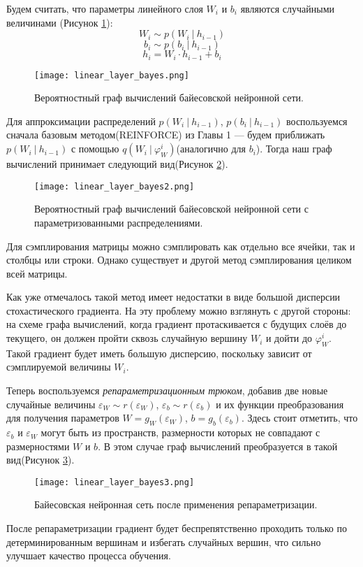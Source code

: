 Будем считать, что параметры линейного слоя $W_i$ и $b_i$ являются случайными величинами (Рисунок \ref{fig:linear_layer_bayes}):
$$W_i \sim p(W_i\ |\ h_{i-1})$$
$$b_i \sim p(b_i\ |\ h_{i-1})$$
$$h_i = W_i \cdot h_{i-1} + b_i$$
\begin{figure}[H]
    \centering
    \texttt{[image: linear\_layer\_bayes.png]}
    \caption{Вероятностный граф вычислений байесовской нейронной сети.}
    \label{fig:linear_layer_bayes}
\end{figure}
Для аппроксимации распределений $p(W_i\ |\ h_{i-1})$, $p(b_i\ |\ h_{i-1})$ воспользуемся сначала базовым методом(REINFORCE) из Главы 1 --- будем приближать $p(W_i\ |\ h_{i-1})$ с помощью $q(W_i\ |\ \varphi_W^i)$(аналогично для $b_i$). Тогда
 наш граф вычислений принимает следующий вид(Рисунок \ref{fig:linear_layer_bayes2}).
\begin{figure}[H]
    \centering
    \texttt{[image: linear\_layer\_bayes2.png]}
    \caption{Вероятностный граф вычислений байесовской нейронной сети с параметризованными распределениями.}
    \label{fig:linear_layer_bayes2}
\end{figure}
Для сэмплирования матрицы можно сэмплировать как отдельно все ячейки, так и столбцы или строки. Однако существует и другой метод сэмплирования целиком всей матрицы\cite{matrix_gaussian_posterior}.

Как уже отмечалось такой метод имеет недостатки в виде большой дисперсии стохастического градиента. На эту проблему можно взглянуть с другой стороны: на схеме графа вычислений, когда градиент протаскивается с будущих слоёв
 до текущего, он должен пройти сквозь случайную вершину $W_i$ и дойти до $\varphi_W^i$. Такой градиент будет иметь большую дисперсию, поскольку зависит от сэмплируемой величины $W_i$.

Теперь воспользуемся \textit{репараметризационным трюком}, добавив две новые случайные величины $\varepsilon_W \sim r(\varepsilon_W)$, $\varepsilon_b \sim r(\varepsilon_b)$ и их функции преобразования для получения параметров
 $W = g_{W}(\varepsilon_W)$, $b = g_{b}(\varepsilon_b)$. Здесь стоит отметить, что $\varepsilon_b$ и $\varepsilon_W$ могут быть из пространств, размерности которых не совпадают с размерностями $W$ и $b$.
 В этом случае граф вычислений преобразуется в такой вид(Рисунок \ref{fig:linear_layer_bayes3}).
\begin{figure}[H]
    \centering
    \texttt{[image: linear\_layer\_bayes3.png]}
    \caption{Байесовская нейронная сеть после применения репараметризации.}
    \label{fig:linear_layer_bayes3}
\end{figure}
После репараметризации градиент будет беспрепятственно проходить только по детерминированным вершинам и избегать случайных вершин, что сильно улучшает качество процесса обучения.

